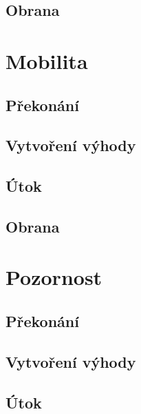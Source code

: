 \documentclass[../main.tex]{subfiles}
\begin{document}
\subsection*{Obrana}
\label{subsec:medicina-obrana}
\obrana

\section{Mobilita}
\label{sec:mobilita}

\subsection*{Překonání}
\label{subsec:mobilita-prekonani}
\prekonani

\subsection*{Vytvoření výhody}
\label{subsec:mobilita-vytvoreni}
\vytvoreni

\subsection*{Útok}
\label{subsec:mobilita-utok}
\utok

\subsection*{Obrana}
\label{subsec:mobilita-obrana}
\obrana

\section{Pozornost}
\label{sec:pozornost}

\subsection*{Překonání}
\label{subsec:pozornost-prekonani}
\prekonani

\subsection*{Vytvoření výhody}
\label{subsec:pozornost-vytvoreni}
\vytvoreni

\subsection*{Útok}
\label{subsec:pozornost-utok}
\utok
\end{document}
